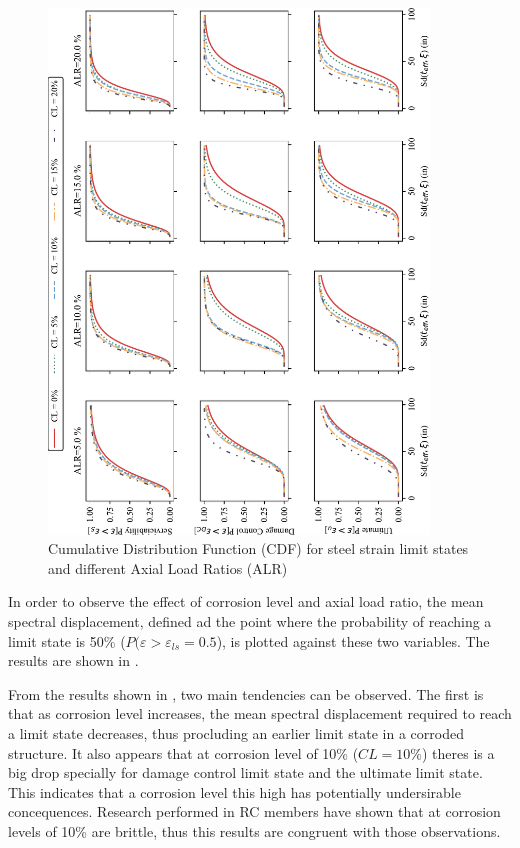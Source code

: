\begin{figure}[htbp]
	\centering
	\includegraphics[width=0.9\textwidth]{VAC Thesis 2.0/Chapter-5/figs/CDF_summary.pdf}
	\caption{Cumulative Distribution Function (CDF) for steel strain limit states and different Axial Load Ratios (ALR)}
	\label{fig:CDF_strain_vs_ALR}
\end{figure}

In order to observe the effect of corrosion level and axial load ratio, the mean spectral displacement, defined ad the point where the probability of reaching a limit state is 50\% ($P(\varepsilon>\varepsilon_{ls}=0.5$), is plotted against these two variables. The results are shown in .

From the results shown in , two main tendencies can be observed. The first is that as corrosion level increases, the mean spectral displacement required to reach a limit state decreases, thus procluding an earlier limit state in a corroded structure. It also appears that at corrosion level of 10\% ($CL=10\%$) theres is a big drop specially for damage control limit state and the ultimate limit state. This indicates that a corrosion level this high has potentially undersirable concequences. Research performed in RC members have shown that at corrosion levels of 10\% are brittle, thus this results are congruent with those observations. 

